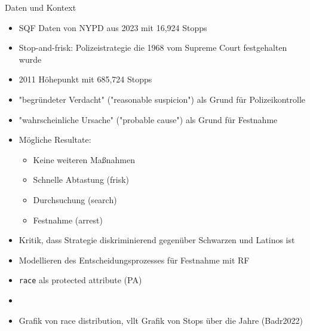 \documentclass[aspectratio=169]{beamer}
\begin{document}
\begin{frame}{Daten und Kontext}
	\begin{itemize}
		\item SQF Daten von NYPD aus 2023 mit 16,924 Stopps
		\item Stop-and-frisk: Polizeistrategie die 1968 vom Supreme Court festgehalten wurde
		\item 2011 Höhepunkt mit 685,724 Stopps 
		\item "begründeter Verdacht" ("reasonable suspicion") als Grund für Polizeikontrolle
		\item "wahrscheinliche Ursache" ("probable cause") als Grund für Festnahme
		\item Mögliche Resultate:
		\begin{itemize}
			\item Keine weiteren Maßnahmen
			\item Schnelle Abtastung (frisk)
			\item Durchsuchung (search)
			\item Festnahme (arrest)
		\end{itemize}
		\item Kritik, dass Strategie diskriminierend gegenüber Schwarzen und Latinos ist
		\item Modellieren des Entscheidungsprozesses für Festnahme mit RF
		\item \texttt{race} als protected attribute (PA)
		\item \item Grafik von race distribution, vllt Grafik von Stops über die Jahre (Badr2022)
	\end{itemize}
\end{frame}
\end{document}
